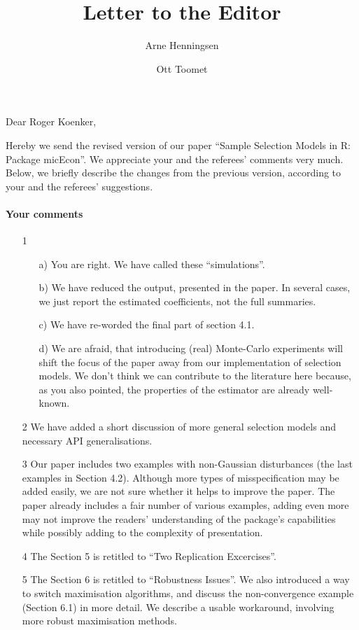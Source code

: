 \documentclass[a4paper]{article}
\title{Letter to the Editor}
\author{Arne Henningsen \and Ott Toomet}
\begin{document}
\maketitle

Dear Roger Koenker,

\bigskip

Hereby we send the revised version of our paper ``Sample Selection
Models in R: Package micEcon''.  We appreciate your and the referees'
comments very much.  Below, we briefly describe the changes from
the previous version, according to your and the referees' suggestions.

\paragraph{Your comments}

\begin{itemize}
\item[1]
  \begin{itemize}
  \item[a)] You are right.  We have called these ``simulations''.
  \item[b)] We have reduced the output, presented in the paper.  In
    several cases, we just report the estimated coefficients, not the
    full summaries.
  \item[c)] We have re-worded the final part of section 4.1.
  \item[d)] We are afraid, that introducing (real) Monte-Carlo
    experiments will shift the focus of the paper away from our
    implementation of selection models.  We don't think we can
    contribute to the literature here because, as you also pointed,
    the properties of the estimator are already well-known.    
  \end{itemize}
\item[2] We have added a short discussion of more general selection
  models and necessary API generalisations.
\item[3] Our paper includes two examples with non-Gaussian
  disturbances (the last examples in Section 4.2).  Although more
  types of misspecification may be added easily, we are not sure
  whether it helps to improve the paper.  The paper already includes a
  fair number of various examples, adding even more may not improve
  the readers' understanding of the package's capabilities while
  possibly adding to the complexity of presentation.
\item[4] The Section 5 is retitled to ``Two Replication Excercises''.
\item[5] The Section 6 is retitled to ``Robustness Issues''.  We also
  introduced a way to switch maximisation algorithms, and discuss the
  non-convergence example (Section 6.1) in more detail.  We describe a
  usable workaround, involving more robust maximisation methods.
\end{itemize}
\end{document}
